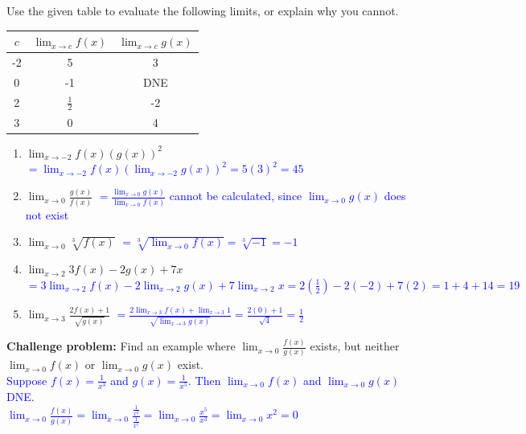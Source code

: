 \documentclass{ximera}
\begin{document}
\begin{exercise}
    Use the given table to evaluate the following limits, or explain why you cannot. \\
  \begin{center}
        \begin{tabular}{c|c|c}
            $c$ & $\lim_{x\rightarrow c}f(x)$ & $\lim_{x\rightarrow c}g(x)$  \\ \hline
            -2 &  5 & 3\\ 
            0 & -1 & DNE\\ 
            2 & $\displaystyle\frac{1}{2}$ & -2\\
            3 & 0 & 4
        \end{tabular}
     \end{center}
     \begin{enumerate}
     \item $\displaystyle\lim_{x\rightarrow -2} f(x)(g(x))^2$ \textcolor{blue}{ $\displaystyle=\lim_{x\rightarrow -2}f(x)(\lim_{x\rightarrow -2} g(x))^2=5(3)^2=45$}
     \item $\displaystyle\lim_{x\rightarrow 0} \frac{g(x)}{f(x)}$ \textcolor{blue}{ $\displaystyle=\frac{\lim_{x\rightarrow 0}g(x)}{\lim_{x\rightarrow 0}f(x)}$ cannot be calculated, since $\lim_{x\rightarrow 0}g(x)$ does not exist}
     \item $\displaystyle \lim_{x\rightarrow 0} \sqrt[3]{f(x)}$ \textcolor{blue}{ $\displaystyle=\sqrt[3]{\lim_{x\rightarrow 0}f(x)}=\sqrt[3]{-1}=-1$}
     \item $\displaystyle \lim_{x\rightarrow 2} 3f(x)-2g(x)+7x$ \textcolor{blue}{ $\displaystyle=3\lim_{x\rightarrow2}f(x)-2\lim_{x\rightarrow 2}g(x)+7\lim_{x\rightarrow2}x=2(\frac{1}{2})-2(-2)+7(2)=1+4+14=19$}
     \item $\displaystyle \lim_{x\rightarrow 3} \frac{2f(x)+1}{\sqrt{g(x)}}$ \textcolor{blue}{ $\displaystyle=\frac{2\lim_{x\rightarrow 3}f(x)+\lim_{x\rightarrow3} 1}{\sqrt{\lim_{x\rightarrow3} g(x)}}=\frac{2(0)+1}{\sqrt{4}}=\frac{1}{2}$}

    \end{enumerate}
\end{exercise}

\begin{exercise}
     \textbf{Challenge problem: }Find an example where $\displaystyle \lim_{x\rightarrow 0} \frac{f(x)}{g(x)}$ exists, but neither $\displaystyle\lim_{x\rightarrow 0}f(x)$ or $\displaystyle \lim_{x\rightarrow 0}g(x)$ exist.\\
     \textcolor{blue}{ Suppose $f(x)=\frac{1}{x^3}$ and $g(x)=\frac{1}{x^5}$.  Then $\lim_{x\rightarrow 0}f(x)$ and $\lim_{x\rightarrow 0}g(x)$ DNE.\\
 $\displaystyle\lim_{x\rightarrow 0}\frac{f(x)}{g(x)}=\lim_{x\rightarrow 0}\frac{\frac{1}{x^3}}{\frac{1}{x^5}}=\lim_{x\rightarrow 0}\frac{x^5}{x^3}=\lim_{x\rightarrow 0}x^2=0$ }
\end{exercise}
\end{document}
